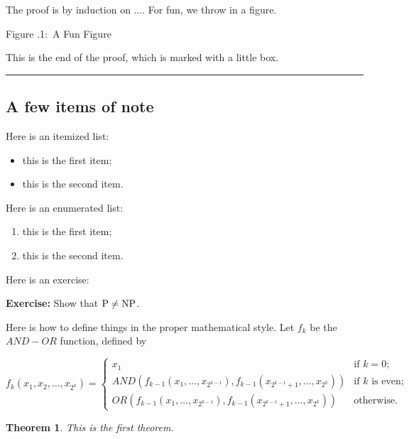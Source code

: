 \documentclass[twoside]{article}
\newcounter{lecnum}
\newcommand{\fig}[3]{
			\vspace{#2}
			\begin{center}
			Figure \thelecnum.#1:~#3
			\end{center}
	}
\newtheorem{theorem}{Theorem}[lecnum]
\newenvironment{proof}{{\bf Proof:}}{\hfill\rule{2mm}{2mm}}
\begin{document}
\begin{proof}
The proof is by induction on $\ldots$.
For fun, we throw in a figure.
\fig{1}{1in}{A Fun Figure}

This is the end of the proof, which is marked with a little box.
\end{proof}

\subsection{A few items of note}

Here is an itemized list:
\begin{itemize}
\item this is the first item;
\item this is the second item.
\end{itemize}

Here is an enumerated list:
\begin{enumerate}
\item this is the first item;
\item this is the second item.
\end{enumerate}

Here is an exercise:

{\bf Exercise:}  Show that ${\rm P}\ne{\rm NP}$.

Here is how to define things in the proper mathematical style.
Let $f_k$ be the $AND-OR$ function, defined by

\[ f_k(x_1, x_2, \ldots, x_{2^k}) = \left\{ \begin{array}{ll}

	x_1 & \mbox{if $k = 0$;} \\

	AND(f_{k-1}(x_1, \ldots, x_{2^{k-1}}),
	   f_{k-1}(x_{2^{k-1} + 1}, \ldots, x_{2^k}))
	 & \mbox{if $k$ is even;} \\

	OR(f_{k-1}(x_1, \ldots, x_{2^{k-1}}),
	   f_{k-1}(x_{2^{k-1} + 1}, \ldots, x_{2^k}))	
	& \mbox{otherwise.} 
	\end{array}
	\right. \]

\begin{theorem}
This is the first theorem.
\end{theorem}
\end{document}
